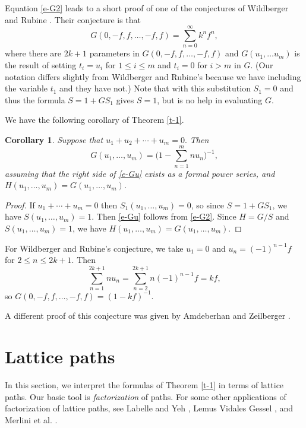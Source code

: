 \documentclass[12pt,reqno, oneside]{amsart}
\newtheorem{cor}[thm]{Corollary}
\begin{document}
Equation \eqref{e-G2} leads to a short proof of one of the conjectures of Wildberger and Rubine \cite[Section 11]{wr}.
Their conjecture is that 
\begin{equation*}
G(0,-f,f,\dots, -f,f) = \sum_{n=0}^\infty k^n f^n,
\end{equation*}
where there are $2k+1$ parameters in $G(0,-f,f,\dots, -f,f)$ and $G(u_1,\dots u_m)$ is the result of setting $t_i= u_i$ for $1\le i\le m$ and $t_i=0$ for $i>m$ in $G$. (Our notation differs slightly from Wildberger and Rubine's because we have including the variable $t_1$ and they have not.) Note that with this substitution $S_1=0$ and thus the formula $S=1+GS_1$ gives $S=1$, but is no help in evaluating $G$.

We have the following corollary of Theorem \ref{t-1}.

\begin{cor}
Suppose that $u_1+u_2+\cdots + u_m = 0.$ Then
\begin{equation}
\label{e-Gu}
G(u_1,\dots, u_m) = \biggl(1-\sum_{n=1}^m nu_n\biggr)^{-1},
\end{equation}
assuming that the right side of \eqref{e-Gu} exists as a formal power series, and $H(u_1,\dots, u_m) = G(u_1, \dots, u_m)$.
\end{cor}

\begin{proof}
If $u_1+\cdots+u_m=0$ then $S_1(u_1,\dots, u_m) = 0$, so since $S = 1+GS_1$, we have $S(u_1,\dots, u_m) = 1$. Then \eqref{e-Gu}  follows from \eqref{e-G2}. 
Since $H=G/S$ and $S(u_1,\dots, u_m)=1$, we have $H(u_1,\dots, u_m) = G(u_1,\dots, u_m)$.
\end{proof}


For Wildberger and Rubine's conjecture, we take $u_1=0$ and $u_n=(-1)^{n-1} f$ for $2\le n\le 2k+1$.
Then 
\begin{equation*}
\sum_{n=1}^{2k+1} nu_n = \sum_{n=2}^{2k+1} n(-1)^{n-1}f = kf,
\end{equation*}
so $G(0,-f,f,\dots, -f,f) = (1-kf)^{-1}$. 

A different proof of this conjecture was given by Amdeberhan and Zeilberger \cite[Theorem 3.1]{az}.

\section{Lattice paths}
\label{s-paths}

In this section, we interpret the formulas of Theorem \ref{t-1} in terms of lattice paths. Our basic tool is \emph{factorization} of paths. For some other applications of factorization of lattice paths, see Labelle and Yeh \cite{ly}, Lemus Vidales \cite{cristobal}
Gessel \cite{imgfact, imglag}, and Merlini et al. \cite{mrsv}.
\end{document}
